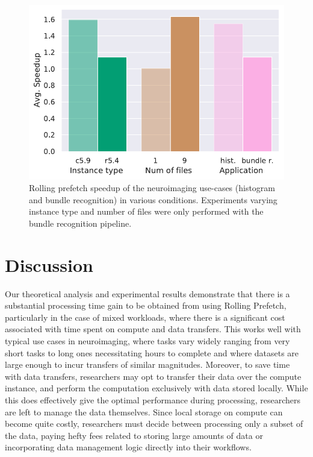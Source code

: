 \documentclass[conference]{IEEEtran}
\begin{document}
\begin{figure}
\begin{center}
\includegraphics[width=\columnwidth]{figures/speedup.pdf}
\setlength{\abovecaptionskip}{-10pt}
\setlength{\belowcaptionskip}{-8pt}
\caption{Rolling prefetch speedup of the neuroimaging use-cases (histogram and bundle recognition) in various conditions. Experiments varying instance type and number of files were only performed with the bundle recognition pipeline.} 
\label{fig:speedup}
\end{center}
\end{figure}


\section{Discussion}

Our theoretical analysis and experimental results demonstrate that there is a substantial processing time gain to be
obtained from using Rolling Prefetch, particularly in the case of mixed workloads, where there is a significant
cost associated with time spent on compute and data transfers. This works well with typical use cases in neuroimaging,
where tasks vary widely ranging from very short tasks to long ones necessitating hours to complete and where datasets
are large enough to incur transfers of similar magnitudes. Moreover, to save time with data transfers, researchers
may opt to transfer their data over the compute instance, and perform the computation exclusively with
data stored locally. While this does effectively give the optimal performance during processing, researchers are left to manage
the data themselves. Since local storage on compute can become quite costly, researchers must decide between
processing only a subset of the data, paying hefty fees related to storing large amounts of data or 
incorporating data management logic directly into their workflows. 
\end{document}
